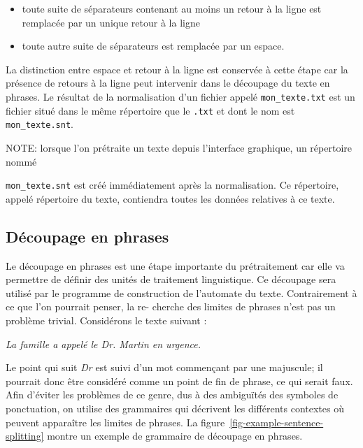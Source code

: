 \begin{itemize}
  \item toute suite de séparateurs contenant au moins un retour à la ligne est remplacée par
  un unique retour à la ligne
  \item toute autre suite de séparateurs est remplacée par un espace.
\end{itemize}

\bigskip
\noindent 
La distinction entre espace et retour à la ligne est conservée à cette étape car la présence
de retours à la ligne peut intervenir dans le découpage du texte en phrases. Le résultat de
la normalisation d’un fichier appelé \verb+mon_texte.txt+ est un fichier situé dans le même
répertoire que le \verb+.txt+ et dont le nom est \verb+mon_texte.snt+. 

\bigskip
\noindent NOTE: lorsque l’on prétraite un texte depuis l’interface graphique, un répertoire nommé

\noindent \verb+mon_texte.snt+ est créé immédiatement après la normalisation. Ce répertoire, appelé
répertoire du texte, 
 contiendra toutes les données relatives à ce texte.



\subsection{Découpage en phrases}
\label{section-sentence-splitting}
Le découpage en phrases est une étape importante du prétraitement car elle va permettre
de définir des unités de traitement linguistique. Ce découpage sera utilisé par le programme
de construction de l’automate du texte. Contrairement à ce que l’on pourrait penser, la re-
cherche des limites de phrases n’est pas un problème trivial. Considérons le texte suivant :


\bigskip
\textit{La famille a appelé le Dr. Martin en urgence.}

\bigskip \noindent Le point qui suit \textit{Dr} est suivi d’un mot commençant par une majuscule;
il pourrait donc être considéré comme un point de fin de phrase, ce qui serait faux. Afin d’éviter
les problèmes de ce genre, dus à des ambiguïtés des symboles de ponctuation, on utilise des
grammaires qui décrivent les différents contextes où peuvent apparaître les limites de phrases.
La figure~\ref{fig-example-sentence-splitting} montre un exemple de grammaire de découpage en
phrases.

